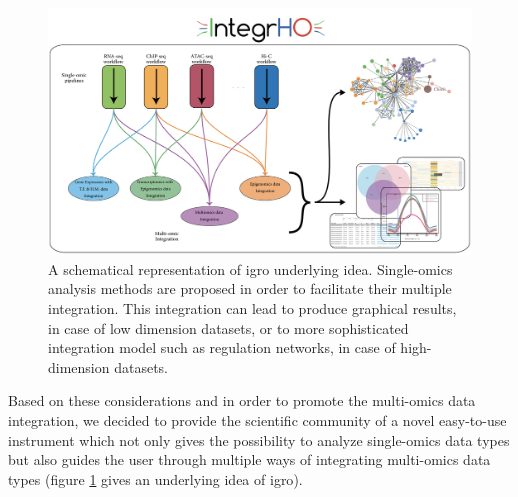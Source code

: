 \begin{figure}[H]
\centering
\includegraphics[width=\textwidth, keepaspectratio]{img/integrho/integrho_scheme.pdf}
\caption[\gls{igro} representation]{A schematical representation of \gls{igro} underlying idea.
Single-omics analysis methods are proposed in order to facilitate their multiple integration.
This integration can lead to produce graphical results, in case of low dimension datasets, or to more sophisticated integration model such as regulation networks, in case of high-dimension datasets.}
\label{fig:integrhoidea}
\end{figure}

Based on these considerations and in order to promote the multi-omics data integration, we decided to provide the scientific community of a novel easy-to-use instrument which not only gives the possibility to analyze single-omics data types but also guides the user through multiple ways of integrating multi-omics data types (figure \ref{fig:integrhoidea} gives an underlying idea of \gls{igro}).








